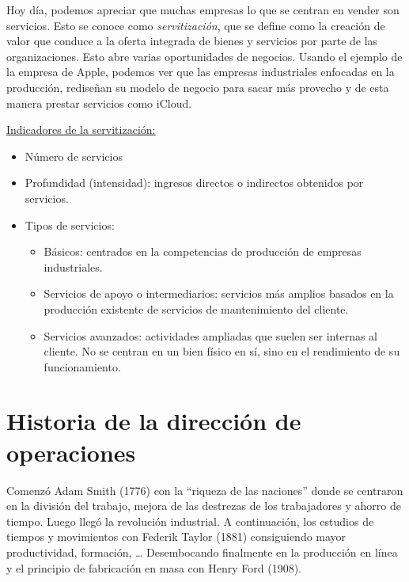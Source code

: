 \documentclass[12pt]{book} %
\providecommand{\tightlist}{%
  \setlength{\itemsep}{0pt}\setlength{\parskip}{0pt}}
\begin{document}
Hoy día, podemos apreciar que muchas empresas lo que se centran en
vender son servicios. Esto se conoce como \emph{servitización}, que se
define como la creación de valor que conduce a la oferta integrada de
bienes y servicios por parte de las organizaciones. Esto abre varias
oportunidades de negocios. Usando el ejemplo de la empresa de Apple,
podemos ver que las empresas industriales enfocadas en la producción,
rediseñan su modelo de negocio para sacar más provecho y de esta manera
prestar servicios como iCloud.

\underline{Indicadores de la servitización:}

\begin{itemize}
\tightlist
\item
  Número de servicios\\
\item
  Profundidad (intensidad): ingresos directos o indirectos obtenidos por
  servicios.\\
\item
  Tipos de servicios:

  \begin{itemize}
  \tightlist
  \item
    Básicos: centrados en la competencias de producción de empresas
    industriales.\\
  \item
    Servicios de apoyo o intermediarios: servicios más amplios basados
    en la producción existente de servicios de mantenimiento del
    cliente.\\
  \item
    Servicios avanzados: actividades ampliadas que suelen ser internas
    al cliente. No se centran en un bien físico en sí, sino en el
    rendimiento de su funcionamiento.
  \end{itemize}
\end{itemize}

\hypertarget{historia-de-la-direcciuxf3n-de-operaciones}{%
\section{Historia de la dirección de
operaciones}\label{historia-de-la-direcciuxf3n-de-operaciones}}

Comenzó Adam Smith (1776) con la ``riqueza de las naciones'' donde se
centraron en la división del trabajo, mejora de las destrezas de los
trabajadores y ahorro de tiempo. Luego llegó la revolución industrial. A
continuación, los estudios de tiempos y movimientos con Federik Taylor
(1881) consiguiendo mayor productividad, formación, \ldots{}
Desembocando finalmente en la producción en línea y el principio de
fabricación en masa con Henry Ford (1908).
\end{document}
